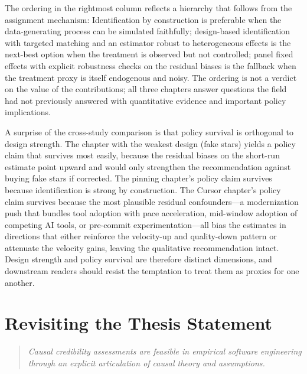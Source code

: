 The ordering in the rightmost column reflects a hierarchy that follows from the assignment mechanism: Identification by construction is preferable when the data-generating process can be simulated faithfully; design-based identification with targeted matching and an estimator robust to heterogeneous effects is the next-best option when the treatment is observed but not controlled; panel fixed effects with explicit robustness checks on the residual biases is the fallback when the treatment proxy is itself endogenous and noisy.
The ordering is not a verdict on the value of the contributions; all three chapters answer questions the field had not previously answered with quantitative evidence and important policy implications.

A surprise of the cross-study comparison is that policy survival is orthogonal to design strength.
The chapter with the weakest design (fake stars) yields a policy claim that survives most easily, because the residual biases on the short-run estimate point upward and would only strengthen the recommendation against buying fake stars if corrected.
The pinning chapter's policy claim survives because identification is strong by construction.
The Cursor chapter's policy claim survives because the most plausible residual confounders---a modernization push that bundles tool adoption with pace acceleration, mid-window adoption of competing AI tools, or pre-commit experimentation---all bias the estimates in directions that either reinforce the velocity-up and quality-down pattern or attenuate the velocity gains, leaving the qualitative recommendation intact.
Design strength and policy survival are therefore distinct dimensions, and downstream readers should resist the temptation to treat them as proxies for one another.

\section{Revisiting the Thesis Statement}
\label{sec:conclusion-thesis-statement}

\begin{quote}
\emph{Causal credibility assessments are feasible in empirical software engineering through an explicit articulation of causal theory and assumptions.}
\end{quote}


